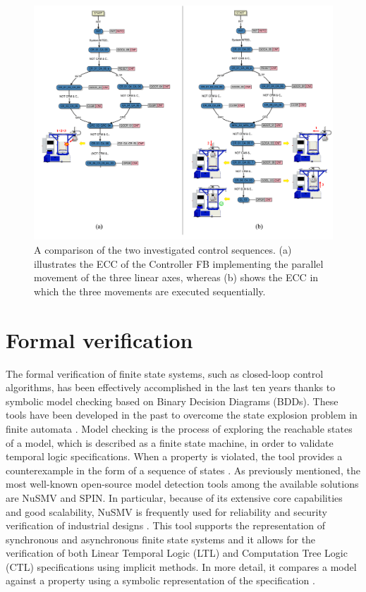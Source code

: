 \begin{bibunit}
\begin{figure}
    \centering
    \includegraphics[width=\textwidth]{MX_Papers/Paper4/pictures/lilli09.eps}
    \caption{A comparison of the two investigated control sequences. (a) illustrates the ECC of the Controller FB implementing the parallel movement of the three linear axes, whereas (b) shows the ECC in which the three movements are executed sequentially.} 
    \label{fig:par_seq}
\end{figure}

\newpage

\section{Formal verification}
\label{sec:formal_verification}
The formal verification of finite state systems, such as \mbox{closed-loop} control algorithms, has been effectively accomplished in the last ten years thanks to symbolic model checking based on Binary Decision Diagrams (BDDs). These tools have been developed in the past to overcome the state explosion problem in finite automata \cite{burch1992}. 
Model checking is the process of exploring the reachable states of a model, which is described as a finite state machine, in order to validate temporal logic specifications.
When a property is violated, the tool provides a counterexample in the form of a sequence of states \cite{Biere2003}. As previously mentioned, the most well-known open-source model detection tools among the available solutions are NuSMV and SPIN. In particular, because of its extensive core capabilities and good scalability, NuSMV is frequently used for reliability and security verification of industrial designs \cite{xu2018}. This tool supports the representation of synchronous and asynchronous finite state systems and it allows for the verification of both Linear Temporal Logic (LTL) and Computation Tree Logic (CTL) specifications using implicit methods. In more detail, it compares a model against a property using a symbolic representation of the specification \cite{frappier2010}. 


\end{bibunit}
